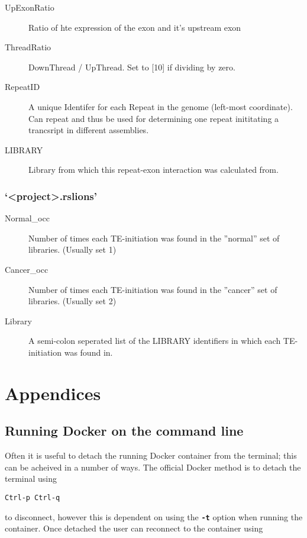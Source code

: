 \documentclass[11pt]{scrartcl}
\newcommand{\arrows}[1]{\textless #1\textgreater}
\begin{document}
\begin{description}
\item[UpExonRatio] Ratio of hte expression of the exon and it's upstream exon

\item[ThreadRatio] DownThread / UpThread. Set to [10] if dividing by zero.

\item[RepeatID] A unique Identifer for each Repeat in the genome (left-most
  coordinate). Can repeat and thus be used for determining one repeat
  inititating a trancsript in different assemblies.

\item[LIBRARY] Library from which this repeat-exon interaction was calculated from.
\end{description}


\subsubsection{`\arrows{project}.rslions'}
\begin{description}
\item[Normal\_occ] Number of times each TE-initiation was found in the ''normal'' set of libraries. (Usually set 1)

\item[Cancer\_occ] Number of times each TE-initiation was found in the ''cancer'' set of libraries. (Usually set 2)

\item[Library] A semi-colon seperated list of the LIBRARY identifiers in which each TE-initiation was found in.
\end{description}  

\clearpage
\appendix
\section{Appendices}
\subsection{Running Docker on the command line}

Often it is useful to detach the running Docker container from the terminal; this can be acheived in a number of ways. The official Docker method is to detach the terminal using 

\texttt{Ctrl-p Ctrl-q}

to disconnect, however this is dependent on using the \texttt{\textbf{-t}} option when running the container. Once detached the user can reconnect to the container using
\end{document}
